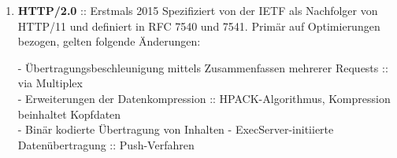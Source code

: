 \documentclass[11pt]{article}
\begin{document}
\begin{enumerate}[\thesection .1]
\begin{enumerate}[$\diamond$]
        \item \textbf{HTTP/2.0} :: Erstmals 2015
        Spezifiziert von der IETF als Nachfolger von HTTP/11 und definiert in RFC 7540 und 7541.
        Primär auf Optimierungen bezogen, gelten folgende Änderungen:
        \begin{addmargin}[1em]{1em}
            - Übertragungsbeschleunigung mittels Zusammenfassen mehrerer Requests :: via Multiplex\\
            - Erweiterungen der Datenkompression :: HPACK-Algorithmus, Kompression beinhaltet Kopfdaten\\
            - Binär kodierte Übertragung von Inhalten
            - ExecServer-initiierte Datenübertragung :: Push-Verfahren\\
        \end{addmargin}


\end{enumerate}
\end{enumerate}
\end{document}
